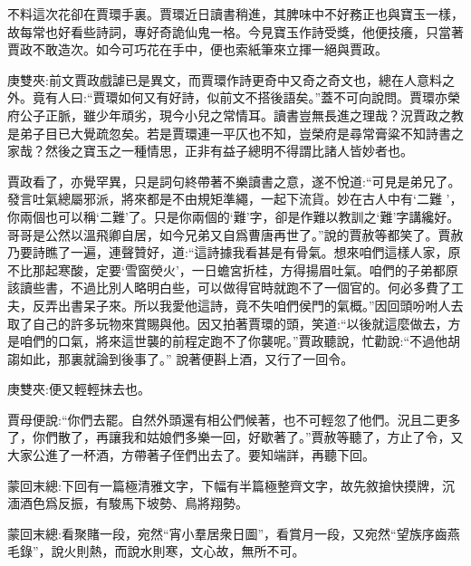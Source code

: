 \begin{parag}
    不料這次花卻在賈環手裏。賈環近日讀書稍進，其脾味中不好務正也與寶玉一樣，故每常也好看些詩詞，專好奇詭仙鬼一格。今見寶玉作詩受獎，他便技癢，只當著賈政不敢造次。如今可巧花在手中，便也索紙筆來立揮一絕與賈政。\begin{note}庚雙夾:前文賈政戲謔已是異文，而賈環作詩更奇中又奇之奇文也，總在人意料之外。竟有人曰:“賈環如何又有好詩，似前文不搭後語矣。”蓋不可向說問。賈環亦榮府公子正脈，雖少年頑劣，現今小兒之常情耳。讀書豈無長進之理哉？況賈政之教是弟子目已大覺疏忽矣。若是賈環連一平仄也不知，豈榮府是尋常膏粱不知詩書之家哉？然後之寶玉之一種情思，正非有益子總明不得謂比諸人皆妙者也。\end{note}賈政看了，亦覺罕異，只是詞句終帶著不樂讀書之意，遂不悅道:“可見是弟兄了。發言吐氣總屬邪派，將來都是不由規矩準繩，一起下流貨。妙在古人中有‘二難 ’，你兩個也可以稱‘二難’了。只是你兩個的‘難’字，卻是作難以教訓之‘難’字講纔好。哥哥是公然以溫飛卿自居，如今兄弟又自爲曹唐再世了。”說的賈赦等都笑了。賈赦乃要詩瞧了一遍，連聲贊好，道:“這詩據我看甚是有骨氣。想來咱們這樣人家，原不比那起寒酸，定要‘雪窗熒火’，一日蟾宮折桂，方得揚眉吐氣。咱們的子弟都原該讀些書，不過比別人略明白些，可以做得官時就跑不了一個官的。何必多費了工夫，反弄出書呆子來。所以我愛他這詩，竟不失咱們侯門的氣概。”因回頭吩咐人去取了自己的許多玩物來賞賜與他。因又拍著賈環的頭，笑道:“以後就這麼做去，方是咱們的口氣，將來這世襲的前程定跑不了你襲呢。”賈政聽說，忙勸說:“不過他胡謅如此，那裏就論到後事了。” 說著便斟上酒，又行了一回令。\begin{note}庚雙夾:便又輕輕抹去也。\end{note}賈母便說:“你們去罷。自然外頭還有相公們候著，也不可輕忽了他們。況且二更多了，你們散了，再讓我和姑娘們多樂一回，好歇著了。”賈赦等聽了，方止了令，又大家公進了一杯酒，方帶著子侄們出去了。要知端詳，再聽下回。
\end{parag}


\begin{parag}
    \begin{note}蒙回末總:下回有一篇極清雅文字，下幅有半篇極整齊文字，故先敘搶快摸牌，沉湎酒色爲反振，有駿馬下坡勢、鳥將翔勢。\end{note}
\end{parag}


\begin{parag}
    \begin{note}蒙回末總:看聚賭一段，宛然“宵小羣居衆日圖”，看賞月一段，又宛然“望族序齒燕毛錄”，說火則熱，而說水則寒，文心故，無所不可。\end{note}
\end{parag}
